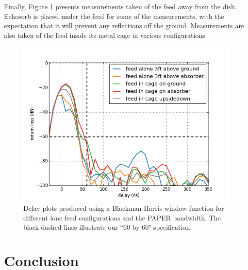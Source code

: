 \documentclass[12pt,preprint]{aastex}
\begin{document}
Finally, Figure \ref{fig:outofthedish} presents measurements taken of the feed away from the dish. Echosorb is placed under the feed for some of the measurements, with the expectation that it will prevent any reflections off the ground. Measurements are also taken of the feed inside its metal cage in various configurations. 

\begin{figure}
\centering
\includegraphics[totalheight=0.4\textheight]{plots/delay_feed.png}
\caption{Delay plots produced using a Blackman-Harris window function for different lone feed configurations and the PAPER bandwidth. The black dashed lines illustrate our ``60 by 60" specification.}
\label{fig:outofthedish}
\end{figure}


\section{Conclusion}
\end{document}
